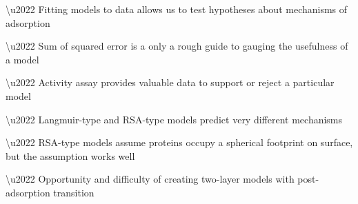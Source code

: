 \textbackslash{}u2022 Fitting models to data allows us to test hypotheses
about mechanisms of adsorption 

\textbackslash{}u2022 Sum of squared error is a only a rough guide
to gauging the usefulness of a model 

\textbackslash{}u2022 Activity assay provides valuable data to support
or reject a particular model 

\textbackslash{}u2022 Langmuir-type and RSA-type models predict very
different mechanisms 

\textbackslash{}u2022 RSA-type models assume proteins occupy a spherical
footprint on surface, but the assumption works well 

\textbackslash{}u2022 Opportunity and difficulty of creating two-layer
models with post-adsorption transition
